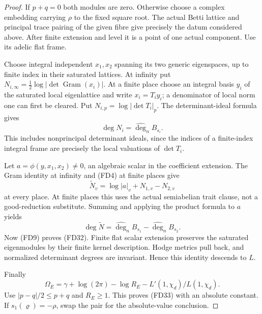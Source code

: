 \begin{proof}
If \(p+q=0\) both modules are zero.
Otherwise choose a complex embedding carrying \(\rho\)
to the fixed square root.
The actual Betti lattice and principal trace pairing of
the given fibre give precisely the datum considered above.
After finite extension and level it is a point of one
actual component.  Use its adelic flat frame.

Choose integral independent \(x_1,x_2\) spanning its two
generic eigenspaces, up to finite index in their saturated
lattices.  At infinity put
\(N_{i,\infty}=\tfrac12\log|\det\operatorname{Gram}(x_i)|\).
At a finite place choose an integral basis \(y_i\) of the
saturated local eigenlattice and write \(x_i=T_i y_i\);
a denominator of local norm one can first be cleared.
Put \(N_{i,p}=\log|\det T_i|_p\).
The determinant-ideal formula gives
\[
                         \deg N_i=\widehat{\deg}_n B_{s_i}.
\]
This includes nonprincipal determinant ideals, since the
indices of a finite-index integral frame are precisely the
local valuations of \(\det T_i\).

Let \(a=\phi(y,x_1,x_2)\ne0\), an algebraic scalar in the
coefficient extension.
The Gram identity at infinity and (FD4) at finite places give
\[
                       \widetilde N_v
                           =\log|a|_v+N_{1,v}-N_{2,v}
\]
at every place.  At finite places this uses the actual
semiabelian trait clause, not a good-reduction substitute.
Summing and applying the product formula to \(a\) yields
\[
              \deg\widetilde N
                       =\widehat{\deg}_n B_{s_1}
                                    -\widehat{\deg}_n B_{s_2}.
\]
Now (FD9) proves (FD32).
Finite flat scalar extension preserves the saturated
eigenmodules by their finite kernel description.
Hodge metrics pull back, and normalized determinant degrees
are invariant.  Hence this identity descends to \(L\).

Finally
\[
          \Omega_E=\gamma+\log(2\pi)-\log R_E
                                  -L'(1,\chi_d)/L(1,\chi_d).
\]
Use \(|p-q|/2\le p+q\) and \(R_E\ge1\).
This proves (FD33) with an absolute constant.
If \(s_1(\varrho)=-\rho\), swap the pair for the absolute-value
conclusion.
\end{proof}

